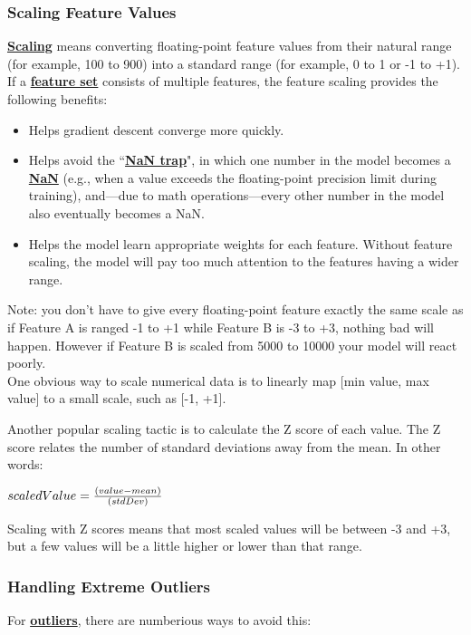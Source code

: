 \documentclass[12pt]{article}
\begin{document}
\subsubsection{Scaling Feature Values}
\href{https://developers.google.com/machine-learning/glossary#scaling}{\textbf{Scaling}} means converting floating-point feature values from their natural range (for example, 100 to 900) into a standard range (for example, 0 to 1 or -1 to +1). If a \href{https://developers.google.com/machine-learning/glossary#feature_set}{\textbf{feature set}} consists of multiple features, the feature scaling provides the following benefits: 
\begin{itemize}
	\item Helps gradient descent converge more quickly.
	\item Helps avoid the ``\href{https://developers.google.com/machine-learning/glossary#NaN_trap}{\textbf{NaN trap}}", in which one number in the model becomes a \href{https://wikipedia.org/wiki/NaN}{\textbf{NaN}} (e.g., when a value exceeds the floating-point precision limit during training), and—due to math operations—every other number in the model also eventually becomes a NaN.
	\item Helps the model learn appropriate weights for each feature. Without feature scaling, the model will pay too much attention to the features having a wider range.
\end{itemize}
Note: you don't have to give every floating-point feature exactly the same scale as if Feature A is ranged -1 to +1 while Feature B is -3 to +3, nothing bad will happen. However if Feature B is scaled from 5000 to 10000 your model will react poorly.
\\One obvious way to scale numerical data is to linearly map [min value, max value] to a small scale, such as [-1, +1].

Another popular scaling tactic is to calculate the Z score of each value. The Z score relates the number of standard deviations away from the mean. In other words: 
\begin{center}
	$scaledValue = {{(value - mean)}\over{(stdDev)}}$
\end{center}
Scaling with Z scores means that most scaled values will be between -3 and +3, but a few values will be a little higher or lower than that range.
\subsubsection{Handling Extreme Outliers}
For \href{https://developers.google.com/machine-learning/glossary#outliers}{\textbf{outliers}}, there are numberious ways to avoid this:
\end{document}

